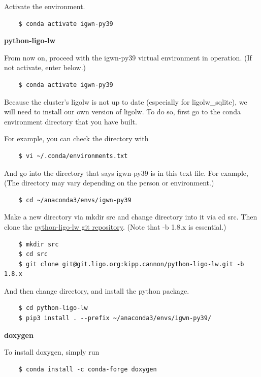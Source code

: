 Activate the environment.

\begin{verbatim}
    $ conda activate igwn-py39
\end{verbatim}

\textbf{python-ligo-lw}

From now on, proceed with the igwn-py39 virtual environment in operation. (If not activate, enter below.)

\begin{verbatim}
    $ conda activate igwn-py39
\end{verbatim}

Because the cluster's ligolw is not up to date (especially for ligolw\_sqlite), we will need to install our own version of ligolw. To do so, first go to the conda environment directory that you have built.

For example, you can check the directory with

\begin{verbatim}
    $ vi ~/.conda/environments.txt
\end{verbatim}

And go into the directory that says igwn-py39 is in this text file. For example, (The directory may vary depending on the person or environment.)

\begin{verbatim}
    $ cd ~/anaconda3/envs/igwn-py39
\end{verbatim}

Make a new directory via mkdir src and change directory into it via cd src. Then clone the \href{https://git.ligo.org/kipp/python-ligo-lw/-/tree/1.8.x?ref_type=heads}{python-ligo-lw git repository}. (Note that -b 1.8.x is essential.)

\begin{verbatim}
    $ mkdir src
    $ cd src
    $ git clone git@git.ligo.org:kipp.cannon/python-ligo-lw.git -b 1.8.x
\end{verbatim}

And then change directory, and install the python package.

\begin{verbatim}
    $ cd python-ligo-lw
    $ pip3 install . --prefix ~/anaconda3/envs/igwn-py39/
\end{verbatim}

\textbf{doxygen}

To install doxygen, simply run

\begin{verbatim}
    $ conda install -c conda-forge doxygen
\end{verbatim}

